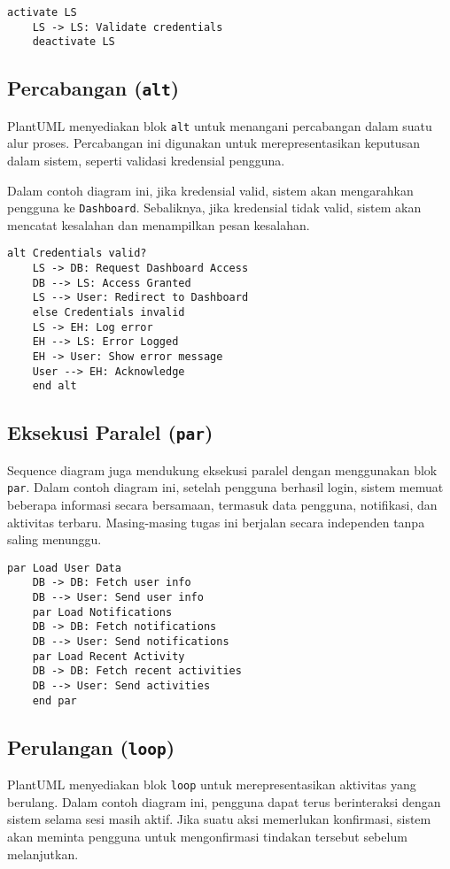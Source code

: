 \begin{lstlisting}[language=puml]
	activate LS
	LS -> LS: Validate credentials
	deactivate LS
\end{lstlisting}

\subsection{Percabangan (\texttt{alt})}
PlantUML menyediakan blok \texttt{alt} untuk menangani percabangan dalam suatu alur proses. Percabangan ini digunakan untuk merepresentasikan keputusan dalam sistem, seperti validasi kredensial pengguna.

Dalam contoh diagram ini, jika kredensial valid, sistem akan mengarahkan pengguna ke \texttt{Dashboard}. Sebaliknya, jika kredensial tidak valid, sistem akan mencatat kesalahan dan menampilkan pesan kesalahan.

\begin{lstlisting}[language=puml]
	alt Credentials valid?
	LS -> DB: Request Dashboard Access
	DB --> LS: Access Granted
	LS --> User: Redirect to Dashboard
	else Credentials invalid
	LS -> EH: Log error
	EH --> LS: Error Logged
	EH -> User: Show error message
	User --> EH: Acknowledge
	end alt
\end{lstlisting}

\subsection{Eksekusi Paralel (\texttt{par})}
Sequence diagram juga mendukung eksekusi paralel dengan menggunakan blok \texttt{par}. Dalam contoh diagram ini, setelah pengguna berhasil login, sistem memuat beberapa informasi secara bersamaan, termasuk data pengguna, notifikasi, dan aktivitas terbaru. Masing-masing tugas ini berjalan secara independen tanpa saling menunggu.

\begin{lstlisting}[language=puml]
	par Load User Data
	DB -> DB: Fetch user info
	DB --> User: Send user info
	par Load Notifications
	DB -> DB: Fetch notifications
	DB --> User: Send notifications
	par Load Recent Activity
	DB -> DB: Fetch recent activities
	DB --> User: Send activities
	end par
\end{lstlisting}

\subsection{Perulangan (\texttt{loop})}
PlantUML menyediakan blok \texttt{loop} untuk merepresentasikan aktivitas yang berulang. Dalam contoh diagram ini, pengguna dapat terus berinteraksi dengan sistem selama sesi masih aktif. Jika suatu aksi memerlukan konfirmasi, sistem akan meminta pengguna untuk mengonfirmasi tindakan tersebut sebelum melanjutkan.

